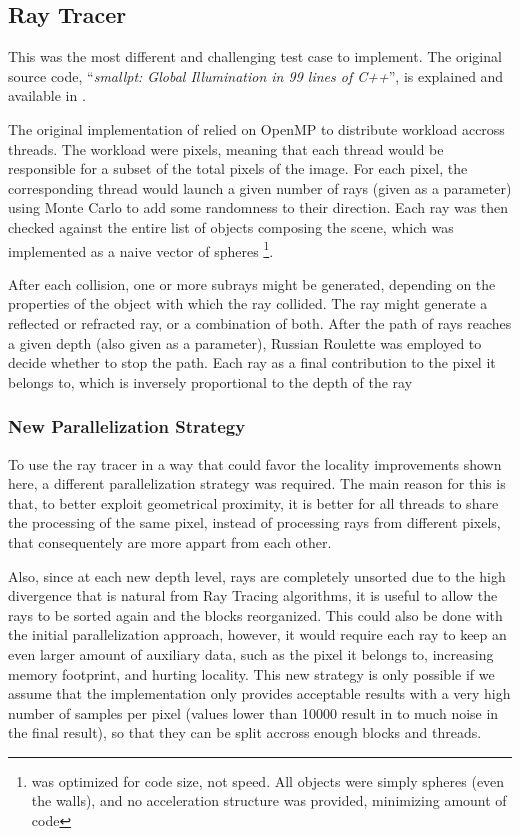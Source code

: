 \subsection{Ray Tracer}
\label{sec:cases:ray}

This was the most different and challenging test case to implement. The original source code, ``\textit{smallpt: Global Illumination in 99 lines of C++}'', is explained and available in \cite{99lines}.

The original implementation of \smallpt relied on OpenMP to distribute workload accross threads. The workload were pixels, meaning that each thread would be responsible for a subset of the total pixels of the image. For each pixel, the corresponding thread would launch a given number of rays (given as a parameter) using Monte Carlo to add some randomness to their direction. Each ray was then checked against the entire list of objects composing the scene, which was implemented as a naive vector of spheres \footnote{\smallpt was optimized for code size, not speed. All objects were simply spheres (even the walls), and no acceleration structure was provided, minimizing amount of code}.

After each collision, one or more subrays might be generated, depending on the properties of the object with which the ray collided. The ray might generate a reflected or refracted ray, or a combination of both. After the path of rays reaches a given depth (also given as a parameter), Russian Roulette was employed to decide whether to stop the path. Each ray as a final contribution to the pixel it belongs to, which is inversely proportional to the depth of the ray

\subsubsection{New Parallelization Strategy}
\label{sec:cases:ray:strat}

To use the ray tracer in a way that could favor the locality improvements shown here, a different parallelization strategy was required. The main reason for this is that, to better exploit geometrical proximity, it is better for all threads to share the processing of the same pixel, instead of processing rays from different pixels, that consequentely are more appart from each other.

Also, since at each new depth level, rays are completely unsorted due to the high divergence that is natural from Ray Tracing algorithms, it is useful to allow the rays to be sorted again and the blocks reorganized. This could also be done with the initial parallelization approach, however, it would require each ray to keep an even larger amount of auxiliary data, such as the pixel it belongs to, increasing memory footprint, and hurting locality.
This new strategy is only possible if we assume that the implementation only provides acceptable results with a very high number of samples per pixel (values lower than 10000 result in to much noise in the final result), so that they can be split accross enough blocks and threads.

